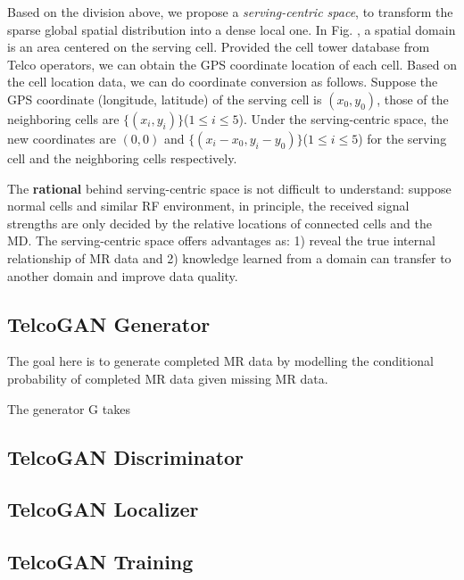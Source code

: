 Based on the division above, we propose a \emph{serving-centric space}, to transform the sparse global spatial distribution into a dense local one. In Fig. , a spatial domain is an area centered on the serving cell. Provided the cell tower database from Telco operators, we can obtain the GPS coordinate location of each cell. Based on the cell location data, we can do coordinate conversion as follows. Suppose the GPS coordinate (longitude, latitude) of the serving cell is $(x_0,y_0)$, those of the neighboring cells are $\{(x_i,y_i)\}$($1\leq i\leq 5$). Under the serving-centric space, the new coordinates are $(0,0)$ and $\{(x_i-x_0,y_i-y_0)\}$($1\leq i\leq 5$) for the serving cell and the neighboring cells respectively.

The \textbf{rational} behind serving-centric space is not difficult to understand: suppose normal cells and similar RF environment, in principle, the received signal strengths are only decided by the relative locations of connected cells and the MD. The serving-centric space offers advantages as: 1) reveal the true internal relationship of MR data and 2) knowledge learned from a domain can transfer to another domain and improve data quality.


\subsection{TelcoGAN Generator}
The goal here is to generate completed MR data by modelling the conditional probability of completed MR data given missing MR data.

The generator G takes 


\subsection{TelcoGAN Discriminator}

\subsection{TelcoGAN Localizer}

\subsection{TelcoGAN Training}
